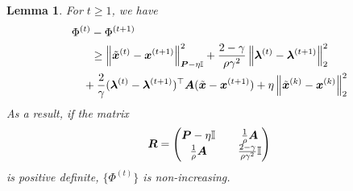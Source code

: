 \documentclass[twocolumn,amsthm]{autart}%
\theoremstyle{definition}
\theoremstyle{plain}
\newtheorem{lemma}{Lemma}
\begin{document}
\begin{lemma}
For $t \ge 1$, we have
\begin{equation}
\label{eq:fcn_decrease}
\begin{multlined}
\Phi^{(t)} - \Phi^{(t+1)}  \\
\ge \norm{\xtil^{(t)}-\bbsym{x}^{(t+1)}}_{\bbsym{P}-\eta \II}^2
+ \frac{2-\gamma}{\rho \gamma^2} \norm{\bbsym{\lambda}^{(t)}-\bbsym{\lambda}^{(t+1)}}_2^2 \\
+ \frac{2}{\gamma} (\bbsym{\lambda}^{(t)}-\bbsym{\lambda}^{(t+1)})^\top \bbsym{A} (\xtil-\bbsym{x}^{(t+1)})
+ \eta \norm{\xtil^{(k)}-\bbsym{x}^{(k)}}_2^2
\end{multlined}
\end{equation}
As a result, if the matrix 
\begin{equation}
\boldsymbol{R} = 
\begin{pmatrix}
\boldsymbol{P} - \eta \mathbb{I} & \quad \frac{1}{\rho} \boldsymbol{A} \\
\frac{1}{\rho} \boldsymbol{A} & \quad \frac{2-\gamma}{\rho \gamma^2} \mathbb{I} \\
\end{pmatrix}
\end{equation}
is positive definite, $\{\Phi^{(t)}\}$ is non-increasing.
\end{lemma}
\end{document}
